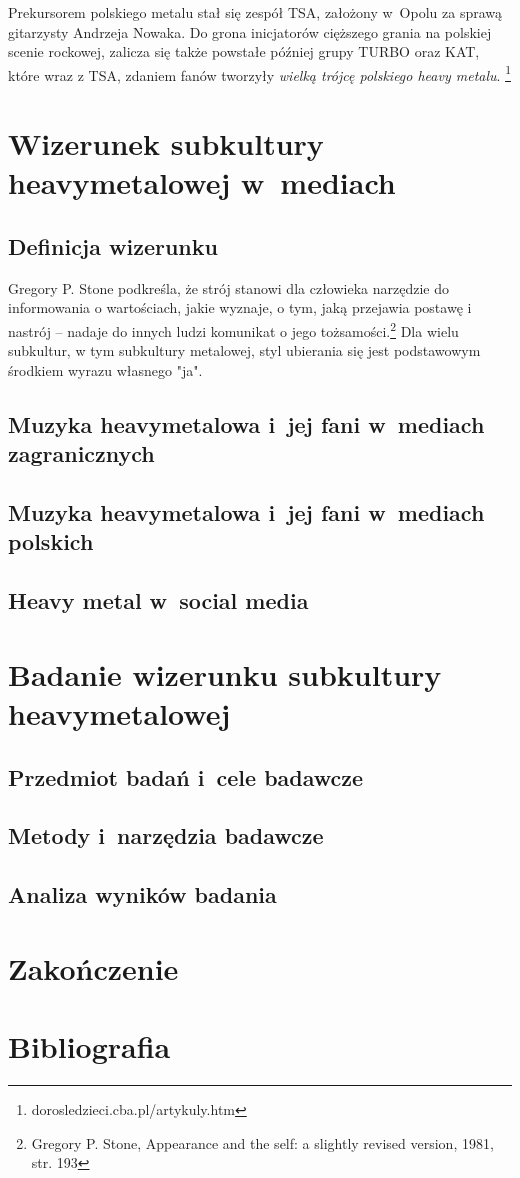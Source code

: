 \documentclass[12pt, a4paper, titlepage]{report}
\begin{document}
Prekursorem polskiego metalu stał się zespół TSA, założony w~Opolu za sprawą gitarzysty Andrzeja Nowaka. Do grona inicjatorów cięższego grania na polskiej scenie rockowej, zalicza się także powstałe później grupy TURBO oraz KAT, które wraz z TSA, zdaniem fanów tworzyły \textit{wielką trójcę polskiego heavy metalu}. \footnote{dorosledzieci.cba.pl/artykuly.htm}

\chapter{Wizerunek subkultury heavymetalowej w~mediach}
\section{Definicja wizerunku}
Gregory P. Stone podkreśla, że strój stanowi dla człowieka narzędzie do informowania o wartościach, jakie wyznaje, o tym, jaką przejawia postawę i nastrój -- nadaje do innych ludzi komunikat o jego tożsamości.\footnote{Gregory P. Stone, Appearance and the self: a slightly revised version, 1981, str. 193} Dla wielu subkultur, w tym subkultury metalowej, styl ubierania się jest podstawowym środkiem wyrazu własnego "ja". 
\section{Muzyka heavymetalowa i~jej fani w~mediach zagranicznych}
\section{Muzyka heavymetalowa i~jej fani w~mediach polskich}
\section{Heavy metal w~social media}
\chapter{Badanie wizerunku subkultury heavymetalowej}
\section{Przedmiot badań i~cele badawcze}
\section{Metody i~narzędzia badawcze}
\section{Analiza wyników badania}
\chapter*{Zakończenie}
\chapter*{Bibliografia}
\end{document}
